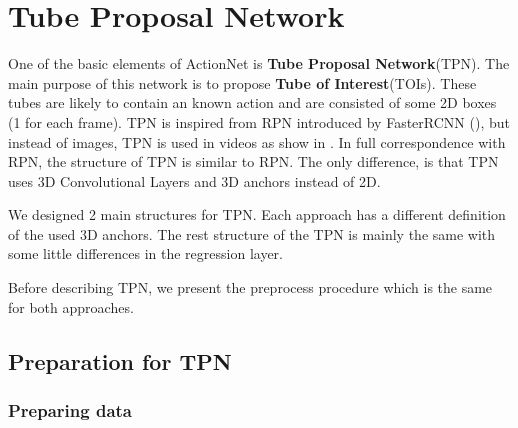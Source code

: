 


% 

\chapter{Tube Proposal Network}

One of the basic elements of ActionNet is \textbf{Tube Proposal Network}(TPN). The main purpose of this network is to propose
\textbf{Tube of Interest}(TOIs). These tubes are likely to contain an known action and are consisted of some 2D boxes
(1 for each frame). TPN is inspired from RPN introduced by FasterRCNN (\cite{Ren:2015:FRT:2969239.2969250}), but instead of images, TPN
is used in videos as show in \cite{DBLP:journals/corr/HouCS17}. In full correspondence with RPN, the structure
of TPN is similar to RPN. The only difference, is that TPN uses 3D Convolutional Layers and 3D anchors instead of 2D. \par
We designed 2 main structures for TPN. Each approach has a different definition of the used 3D anchors.
The rest structure of the TPN is mainly the same with some little differences in the regression layer. \par
Before describing TPN, we present the preprocess procedure which is the same for both approaches.

\section{Preparation for TPN}

\subsection{Preparing data}

